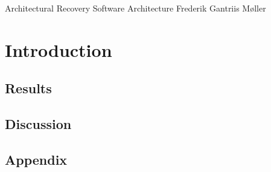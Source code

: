 \documentclass{solutionclass} %
\begin{document}
\pretitle
{Architectural Recovery}               %
{Software Architecture}        %
{Frederik Gantriis Møller}                 %

\def\homeworkNumber{5}

\makeatletter
    \startcontents[sections]
    \chapter{Introduction}
\makeatother





\section{Results}

\section{Discussion} 

\section{Appendix}
    
    \thispagestyle{fancyplain}
    \fancyhead{}
    \renewcommand{\headrulewidth}{0pt}
\end{document}
